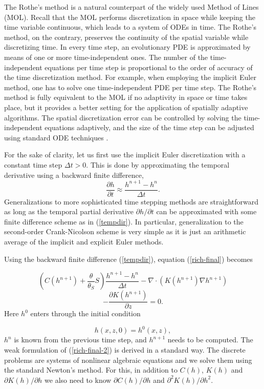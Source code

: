 \documentclass[final,3p,times,twocolumn]{elsarticle}
\begin{document}
The Rothe's method is a natural counterpart of the widely used Method of Lines (MOL). 
Recall that the MOL performs discretization in space while 
keeping the time variable continuous, which leads to a system of ODEs in time. The Rothe's 
method, on the contrary, preserves the continuity of the spatial variable while discretizing time. 
In every time step, an evolutionary PDE is approximated by means of one or more time-independent ones. 
The number of the time-independent equations per time step is proportional to the order of accuracy of the 
time discretization method. For example, when employing the implicit Euler method, one 
has to solve one time-independent PDE per time step. The Rothe's method is fully equivalent to the 
MOL if no adaptivity in space or time takes place, but it provides a better setting 
for the application of spatially adaptive algorithms. The spatial discretization error
can be controlled by solving the time-independent equations adaptively, and the size of 
the time step can be adjusted using standard ODE techniques \cite{hairer}. 

For the sake of clarity, let us first use the 
implicit Euler discretization with a constant time step $\Delta t > 0$.
This is done by approximating the temporal derivative using a backward finite 
difference,
\begin{equation}\label{tempdir}
\frac{\partial h}{\partial t} \approx \frac{h^{n+1} - h^n}{\Delta t}.
\end{equation}
Generalizations to more sophisticated time stepping methods are straightforward
as long as the temporal partial derivative $\partial h / \partial t$ can be approximated
with some finite difference scheme as in (\ref{tempdir}). In particular, 
generalization to the second-order Crank-Nicolson scheme is very simple 
as it is just an arithmetic average of the implicit and explicit Euler methods.  

Using the backward finite difference (\ref{tempdir}), equation (\ref{rich-final}) becomes

$$
\left(C(h^{n+1})
+ \frac{\theta}{\theta_S} S \right) \frac{h^{n+1} - h^n}{\Delta t}
- \nabla \cdot (K(h^{n+1})\nabla h^{n+1})
$$
\begin{equation}\label{rich-final-2}
 - \frac{\partial K(h^{n+1})}{\partial z} = 0.
\end{equation}
Here $h^0$ enters through the initial condition 

\begin{equation}
  h(x, z, 0) = h^0(x,z),
\end{equation}
$h^n$ is known from the previous time step, 
and $h^{n+1}$ needs to be computed. The weak formulation of (\ref{rich-final-2})
is derived in a standard way. The discrete problems are systems of nonlinear
algebraic equations and we solve them using the standard Newton's method. 
For this, in addition to $C(h)$, $K(h)$ and $\partial K(h) / \partial h$ we also 
need to know $\partial C(h) / \partial h$ and $\partial^2 K(h) / \partial h^2$.
\end{document}
